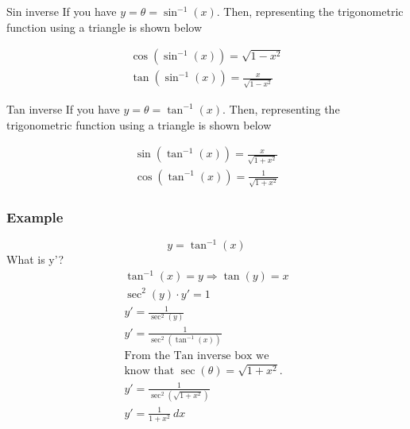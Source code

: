 \documentclass[letterpaper,10pt,twoside,twocolumn,openany]{book}
\begin{document}
\begin{DndComment}{Sin inverse}
    If you have
    $
        y = \theta = \sin^{-1}(x)
    $.
    Then, representing the trigonometric function using a triangle is shown below\\
    \begin{gather}
        \cos(\sin^{-1}(x)) = \sqrt{1 - x^2}\\
        \tan(\sin^{-1}(x)) = \frac{x}{\sqrt{1 - x^2}}
    \end{gather}
\end{DndComment}

\begin{DndComment}{Tan inverse}
    If you have
    $
        y = \theta = \tan^{-1}(x)
    $.
    Then, representing the trigonometric function using a triangle is shown below\\
    \begin{gather}
        \sin(\tan^{-1}(x)) = \frac{x}{\sqrt{1 + x^2}}\\
        \cos(\tan^{-1}(x)) = \frac{1}{\sqrt{1 + x^2}}
    \end{gather}
\end{DndComment}

\newpage

\subsubsection{Example}
$$ 
    y = \tan^{-1}(x) 
$$
What is y'?
\begin{gather*}
    \tan^{-1}(x) = y \Rightarrow \tan(y) = x\\ 
    \sec^2(y)\cdot y' = 1\\ 
    y' = \frac{1}{\sec^2(y)}\\ 
    y' = \frac{1}{\sec^2(\tan^{-1}(x))}\\
    \text{From the Tan inverse box we}\\ 
    \text{know that $\sec(\theta) = \sqrt{1 + x^2}$.}\\ 
    y' = \frac{1}{\sec^2(\sqrt{1 + x^2})}\\ 
    y' = \frac{1}{1 + x^2}\ dx
\end{gather*}
\end{document}
